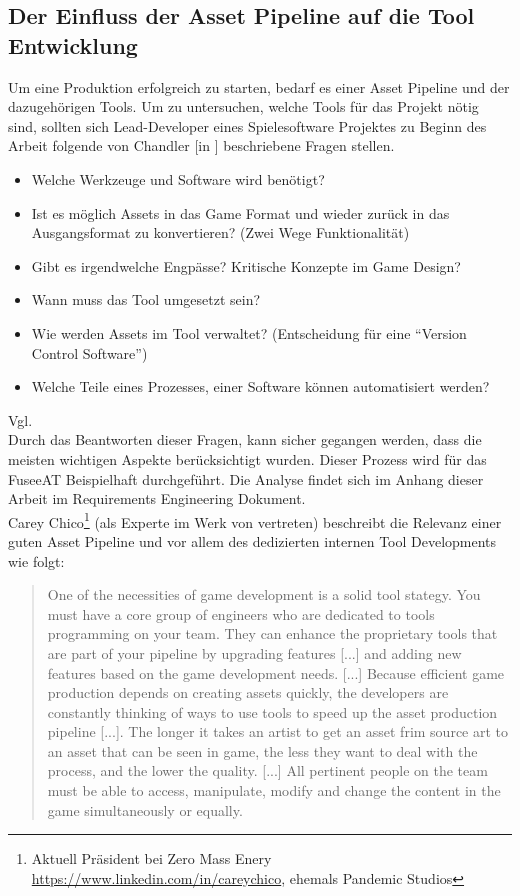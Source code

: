 \documentclass[pagesize, paper=a4, fontsize=12pt, titlepage=true, headings=small, headnosepline, abstractoff, liststotoc, nochapterprefix, plainheadsepline, twoside]{scrreprt}
\begin{document}
\subsection {Der Einfluss der Asset Pipeline auf die Tool Entwicklung}
Um eine Produktion erfolgreich zu starten, bedarf es einer Asset Pipeline und der dazugehörigen Tools. Um zu untersuchen, welche Tools für das Projekt nötig sind, sollten sich Lead-Developer eines Spielesoftware Projektes zu Beginn des Arbeit folgende von Chandler [in \cite[S 223-224]{Chandler2006}] beschriebene Fragen stellen.
\begin{itemize}
\item Welche Werkzeuge und Software wird benötigt?
\item Ist es möglich Assets in das Game Format und wieder zurück in das Ausgangsformat zu konvertieren? (Zwei Wege Funktionalität)
\item Gibt es irgendwelche Engpässe? Kritische Konzepte im Game Design?
\item Wann muss das Tool umgesetzt sein?
\item Wie werden Assets im Tool verwaltet? (Entscheidung für eine “Version Control Software”)
\item Welche Teile eines Prozesses, einer Software können automatisiert werden?
\end{itemize} Vgl. \autocite[S. 224-225]{Chandler2006}
\\
Durch das Beantworten dieser Fragen, kann sicher gegangen werden, dass die meisten wichtigen Aspekte berücksichtigt wurden. Dieser Prozess wird für das FuseeAT Beispielhaft durchgeführt. Die Analyse findet sich im Anhang dieser Arbeit im Requirements Engineering Dokument.
\\
Carey Chico\footnote{Aktuell Präsident bei Zero Mass Enery \url{https://www.linkedin.com/in/careychico}, ehemals Pandemic Studios} (als Experte im Werk von \cite{Chandler2006} vertreten) beschreibt die Relevanz einer guten Asset Pipeline und vor allem des dedizierten internen Tool Developments wie folgt:
\begin{quote}
One of the necessities of game development is a solid tool stategy. You must have a core group of engineers who are dedicated to tools programming on your team. They can enhance the proprietary tools that are part of your pipeline by upgrading features [...] and adding new features based on the game development needs. [...] Because efficient game production depends on creating assets quickly, the developers are constantly thinking of ways to use tools to speed up the asset production pipeline [...]. The longer it takes an artist to get an asset frim source art to an asset that can be seen in game, the less they want to deal with the process, and the lower the quality.
[...]
All pertinent people on the team must be able to access, manipulate, modify and change the content in the game simultaneously or equally.
\autocite[S. 224-225]{Chandler2006}
\end{quote}
\end{document}
